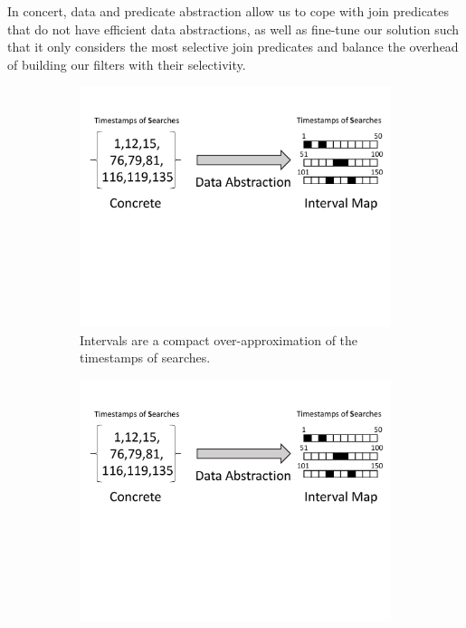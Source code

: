 In concert, data and predicate abstraction allow us to cope with join predicates
that do not have efficient data abstractions, as well as fine-tune our solution
such that it only considers the most selective join predicates and balance the
overhead of building our filters with their selectivity.
\begin{figure}[t]
  \centering
  \begin{subfigure}{\columnwidth}
    \centering    
    \vspace{-0.5cm}
    \includegraphics[clip, page=1,width=\columnwidth]{graphs/motivation.pdf}
    \vspace{-3.5cm}
    \caption{Intervals are a compact over-approximation of the timestamps of 
    searches.}
    \label{fig:dabstraction}
  \end{subfigure}
  \begin{subfigure}{\columnwidth}
    \vspace{-0.5cm}
    \includegraphics[clip, page=2,width=\columnwidth]{graphs/motivation.pdf}

\end{subfigure}
\end{figure}
